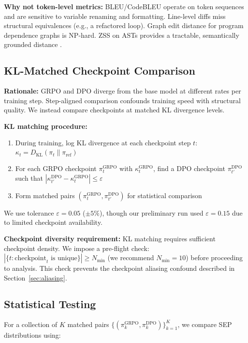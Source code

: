 \textbf{Why not token-level metrics:} BLEU/CodeBLEU operate on token sequences and
are sensitive to variable renaming and formatting. Line-level diffs miss
structural equivalences (e.g., a refactored loop). Graph edit distance for
program dependence graphs is NP-hard. ZSS on ASTs provides a tractable,
semantically grounded distance \cite{Ding2024Revisiting}.

\subsection{KL-Matched Checkpoint Comparison}

\textbf{Rationale:} GRPO and DPO diverge from the base model at different rates per
training step. Step-aligned comparison confounds training speed with structural quality.
We instead compare checkpoints at matched KL divergence levels.

\textbf{KL matching procedure:}
\begin{enumerate}
  \item During training, log KL divergence at each checkpoint step $t$: $\kappa_t = D_\text{KL}(\pi_t \| \pi_\text{ref})$
  \item For each GRPO checkpoint $\pi_t^\text{GRPO}$ with $\kappa_t^\text{GRPO}$, find a DPO checkpoint $\pi_{t'}^\text{DPO}$ such that $|\kappa_{t'}^\text{DPO} - \kappa_t^\text{GRPO}| \leq \varepsilon$
  \item Form matched pairs $(\pi_t^\text{GRPO}, \pi_{t'}^\text{DPO})$ for statistical comparison
\end{enumerate}

We use tolerance $\varepsilon = 0.05$ ($\pm 5\%$), though
our preliminary run used $\varepsilon = 0.15$ due to limited checkpoint availability.

\textbf{Checkpoint diversity requirement:} KL matching requires sufficient checkpoint
density. We impose a pre-flight check: $|\{t : \text{checkpoint}_t \text{ is unique}\}| \geq N_\text{min}$
(we recommend $N_\text{min} = 10$) before proceeding to analysis. This check
prevents the checkpoint aliasing confound described in Section~\ref{sec:aliasing}.

\subsection{Statistical Testing}

For a collection of $K$ matched pairs $\{(\pi_k^\text{GRPO}, \pi_k^\text{DPO})\}_{k=1}^K$,
we compare SEP distributions using:

